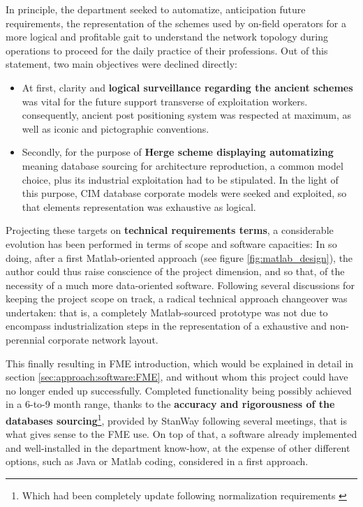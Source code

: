 In principle, the department seeked to automatize, anticipation future requirements, the representation of the schemes used by on-field operators for a more logical and profitable gait to understand the network topology during operations to proceed for the daily practice of their professions. Out of this statement, two main objectives were declined directly: 
\begin{itemize}
    \item At first, clarity and \textbf{logical surveillance regarding the ancient schemes} was vital for the future support transverse of exploitation workers. consequently, ancient post positioning system was respected at maximum, as well as iconic and pictographic conventions.
    \item Secondly, for the purpose of \textbf{Herge scheme displaying automatizing} meaning database sourcing for architecture reproduction, a common model choice, plus its industrial exploitation had to be stipulated. In the light of this purpose, CIM database corporate models were seeked and exploited, so that elements representation was exhaustive as logical. 
\end{itemize}

Projecting these targets on \textbf{technical requirements terms}, a considerable evolution has been performed in terms of scope and software capacities: In so doing, after a first Matlab-oriented approach (see figure \ref{fig:matlab_design}), the author could thus raise conscience of the project dimension, and so that, of the necessity of a much more data-oriented software. 
Following several discussions for keeping the project scope on track, a radical technical approach changeover was undertaken: that is, a completely Matlab-sourced prototype was not due to encompass industrialization steps in the representation of a exhaustive and non-perennial corporate network layout.

This finally resulting in FME introduction, which would be explained in detail in section \ref{sec:approach:software:FME}, and without whom this project could have no longer ended up successfully. Completed functionality being possibly achieved in a 6-to-9 month range, thanks to the \textbf{accuracy and rigorousness of the databases sourcing}\footnote{Which had been completely update following normalization requirements \cite{CIMIEE}}, provided by StanWay following several meetings, that is what gives sense to the FME use. On top of that, a software already implemented and well-installed in the department know-how, at the expense of other different options, such as Java or Matlab coding, considered in a first approach.

